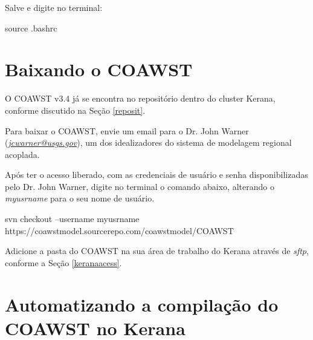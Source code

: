 \noindent Salve e digite no terminal:
\bigskip

\begin{bashcode}
source .bashrc
\end{bashcode}

\section{Baixando o COAWST}\label{coawstbaixa}
\bigskip

\begin{tcolorbox}[enhanced,
  grow to left by=0cm,%
  grow to right by=0cm,%
  enlarge top by=0cm,%
  enlarge bottom by=0cm,%
  tcbox raise base,
  boxrule=1.0pt,
  left=18mm,
  colframe=red!50!black,coltext=red!25!black,colback=red!10!white,
  overlay={\begin{tcbclipinterior}\fill[red!75!blue!50!white] (frame.south west)
    rectangle node[text=white,font=\sffamily\bfseries\footnotesize,rotate=0] {ATENÇÃO} ([xshift=18mm]frame.north west);\end{tcbclipinterior}}]
O COAWST v3.4 já se encontra no repositório dentro do cluster Kerana, conforme discutido na Seção \textcolor{bleu_cite}{\ref{reposit}}.
\end{tcolorbox}
\bigskip

\noindent Para baixar o COAWST, envie um email para o Dr. John Warner (\textcolor{bleu_cite}{\href{jcwarner@usgs.gov}{\textit{jcwarner@usgs.gov}}}), um dos idealizadores do sistema de modelagem regional acoplada.
\bigskip

\noindent Após ter o acesso liberado, com as credenciais de usuário e senha disponibilizadas pelo Dr. John Warner, digite no terminal o comando abaixo, alterando o \textit{myusrname} para o seu nome de usuário.
\bigskip

\begin{bashcode}[fontsize=\footnotesize]
svn checkout --username myusrname https://coawstmodel.sourcerepo.com/coawstmodel/COAWST
\end{bashcode}
\bigskip

\noindent Adicione a pasta do COAWST na sua área de trabalho do Kerana através de \textit{sftp}, conforme a Seção \textcolor{bleu_cite}{\ref{keranaacess}}.
\bigskip

\section{Automatizando a compilação do COAWST no Kerana}\label{autowrf}
\bigskip

